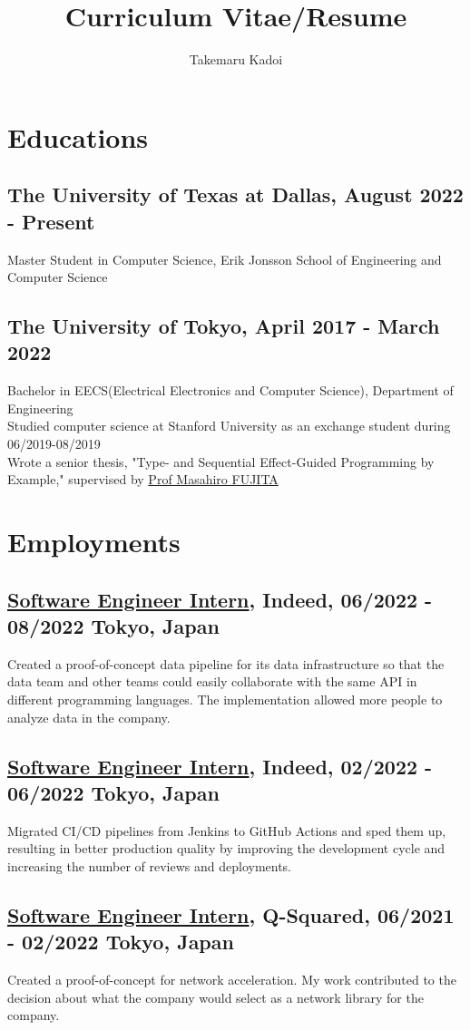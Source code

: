 \documentclass[10pt]{article}
\title{\vspace{-1cm}Curriculum Vitae/Resume}
\author{Takemaru Kadoi}
\date{}
\begin{document}
\section*{Educations}
  \subsection*{The University of Texas at Dallas, August 2022 - Present}
    Master Student in Computer Science, Erik Jonsson School of Engineering and Computer Science
  \subsection*{The University of Tokyo, April 2017 - March 2022}
    Bachelor in EECS(Electrical Electronics and Computer Science), Department of Engineering
    \\
    Studied computer science at Stanford University as an exchange student during 06/2019-08/2019
    \\
    Wrote a senior thesis, "Type- and Sequential Effect-Guided Programming by Example," supervised by \href{https://scholar.google.com/citations?user=tYabznkAAAAJ}{Prof Masahiro FUJITA}

\section*{Employments}
  \subsection*{\underline{Software Engineer Intern}, Indeed, 06/2022 - 08/2022 \hfill Tokyo, Japan}
    Created a proof-of-concept data pipeline for its data infrastructure so that the data team and other teams could easily collaborate with the same API in different programming languages.
    The implementation allowed more people to analyze data in the company.
  \subsection*{\underline{Software Engineer Intern}, Indeed, 02/2022 - 06/2022 \hfill Tokyo, Japan}
    Migrated CI/CD pipelines from Jenkins to GitHub Actions and sped them up, resulting in better production quality by improving the development cycle and increasing the number of reviews and deployments.
  \subsection*{\underline{Software Engineer Intern}, Q-Squared, 06/2021 - 02/2022 \hfill Tokyo, Japan}
    Created a proof-of-concept for network acceleration.
    My work contributed to the decision about what the company would select as a network library for the company.
\end{document}
